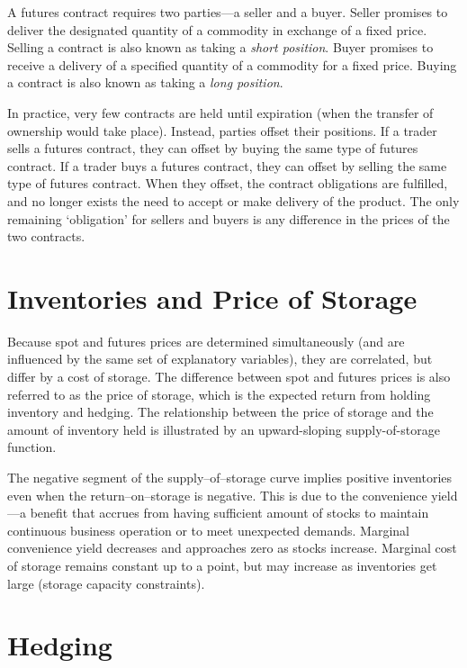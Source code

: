 \documentclass[
  oneside]{book}
\begin{document}
A futures contract requires two parties---a seller and a buyer. Seller promises to deliver the designated quantity of a commodity in exchange of a fixed price. Selling a contract is also known as taking a \emph{short position}. Buyer promises to receive a delivery of a specified quantity of a commodity for a fixed price. Buying a contract is also known as taking a \emph{long position}.

In practice, very few contracts are held until expiration (when the transfer of ownership would take place). Instead, parties offset their positions. If a trader sells a futures contract, they can offset by buying the same type of futures contract. If a trader buys a futures contract, they can offset by selling the same type of futures contract. When they offset, the contract obligations are fulfilled, and no longer exists the need to accept or make delivery of the product. The only remaining `obligation' for sellers and buyers is any difference in the prices of the two contracts.

\hypertarget{inventories-and-price-of-storage}{%
\section{Inventories and Price of Storage}\label{inventories-and-price-of-storage}}

Because spot and futures prices are determined simultaneously (and are influenced by the same set of explanatory variables), they are correlated, but differ by a cost of storage. The difference between spot and futures prices is also referred to as the price of storage, which is the expected return from holding inventory and hedging. The relationship between the price of storage and the amount of inventory held is illustrated by an upward-sloping supply-of-storage function.

The negative segment of the supply--of--storage curve implies positive inventories even when the return--on--storage is negative. This is due to the convenience yield---a benefit that accrues from having sufficient amount of stocks to maintain continuous business operation or to meet unexpected demands. Marginal convenience yield decreases and approaches zero as stocks increase. Marginal cost of storage remains constant up to a point, but may increase as inventories get large (storage capacity constraints).

\hypertarget{hedging}{%
\section{Hedging}\label{hedging}}
\end{document}
